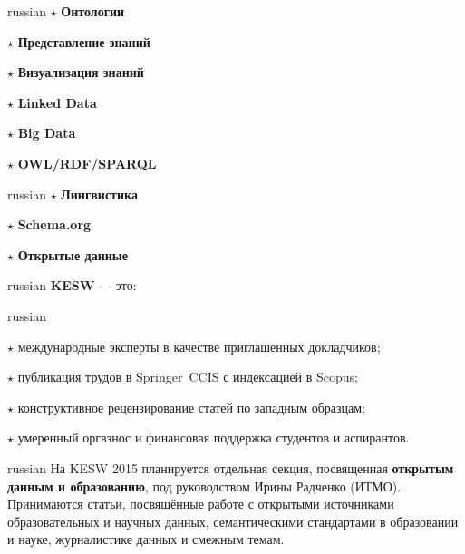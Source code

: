 \documentclass[a4paper, 10pt]{article}
\renewcommand{\skip}{\vspace{1ex}}
\renewcommand{\bullet}{\ensuremath{\star} }
\begin{document}
\begin{minipage}[t]{.35\textwidth}
\begin{otherlanguage*}{russian}
\noindent
\bullet \textbf{Онтологии}

\bullet \textbf{Представление знаний}

\bullet \textbf{Визуализация знаний}

\end{otherlanguage*}
\end{minipage}
\hfill
\begin{minipage}[t]{.30\textwidth}

\bullet \textbf{Linked Data}

\bullet \textbf{Big Data}

\bullet\textbf{OWL/RDF/SPARQL}

\end{minipage}
\hfill
\begin{minipage}[t]{.28\textwidth}

\begin{otherlanguage*}{russian}
\bullet \textbf{Лингвистика}

\bullet \textbf{Schema.org}

\bullet \textbf{Открытые данные}

\end{otherlanguage*}

\end{minipage}

\skip
\skip

\begin{otherlanguage*}{russian}
\noindent \textbf{KESW} --- это:
\end{otherlanguage*}

\skip\skip

\begin{otherlanguage*}{russian}

\noindent\bullet международные эксперты в качестве приглашенных докладчиков;

\noindent\bullet публикация трудов в Springer~CCIS с индексацией в Scopus;

\noindent\bullet конструктивное рецензирование статей по западным образцам;

\noindent\bullet умеренный оргвзнос и финансовая поддержка студентов и аспирантов.

\end{otherlanguage*}

\skip\skip

\begin{otherlanguage*}{russian}
\noindent 
На KESW 2015 планируется отдельная секция, посвященная \textbf{открытым данным и
образованию}, под руководством  Ирины Радченко (ИТМО). Принимаются статьи,
посвящённые работе с открытыми источниками образовательных и научных данных,
семантическими стандартами в образовании и науке, журналистике данных и смежным
темам.
\end{otherlanguage*}
\end{document}
